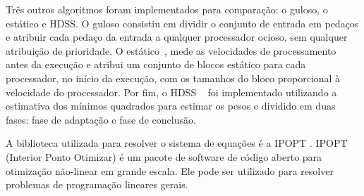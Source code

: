 Três outros algoritmos foram implementados para comparação: o guloso, o estático e 
HDSS. O guloso consistiu em dividir o conjunto de entrada em pedaços e atribuir 
cada pedaço da entrada a qualquer processador ocioso, sem qualquer atribuição de prioridade. O estático~\cite{raphael}, mede as velocidades de processamento antes da execução e  atribui um conjunto 
de blocos estático para cada processador, no início da execução, com os
tamanhos do bloco proporcional à velocidade do processador. Por fim, o HDSS ~\cite{HDSS}  
foi implementado utilizando a estimativa dos mínimos quadrados para estimar os pesos e 
dividido em duas fases: fase de adaptação e fase de conclusão. 

A biblioteca utilizada para resolver o sistema de equações é a IPOPT \cite{point}. IPOPT (Interior Ponto Otimizar) é um pacote de software de código aberto para otimização não-linear em grande escala. Ele pode ser utilizado para resolver problemas de programação lineares gerais.



